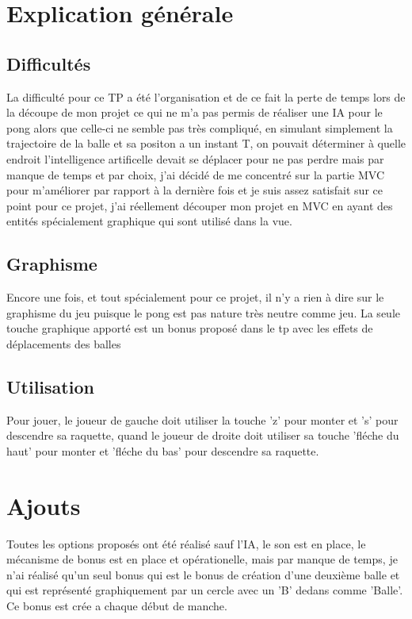 \documentclass[a4paper]{article}
\date{19 Janvier 2017}
\begin{document}
\entete

\section{Explication générale}

\subsection{Difficultés}

La difficulté pour ce TP a été l'organisation et de ce fait la perte de temps lors de la découpe de mon projet ce qui ne m'a pas permis de réaliser une IA pour le pong alors que celle-ci ne semble pas très compliqué, en simulant simplement la trajectoire de la balle et sa positon a un instant T, on pouvait déterminer à quelle endroit l'intelligence artificelle devait se déplacer pour ne pas perdre mais par manque de temps et par choix, j'ai décidé de me concentré sur la partie MVC pour m'améliorer par rapport à la dernière fois et je suis assez satisfait sur ce point pour ce projet, j'ai réellement découper mon projet en MVC en ayant des entités spécialement graphique qui sont utilisé dans la vue.

\subsection{Graphisme}

Encore une fois, et tout spécialement pour ce projet, il n'y a rien à dire sur le graphisme du jeu puisque le pong est pas nature très neutre comme jeu. La seule touche graphique apporté est un bonus proposé dans le tp avec les effets de déplacements des balles


\subsection{Utilisation}

Pour jouer, le joueur de gauche doit utiliser la touche 'z' pour monter et 's' pour descendre sa raquette, quand le joueur de droite doit utiliser sa touche 'fléche du haut' pour monter et 'fléche du bas'
 pour descendre sa raquette. 
\section{Ajouts}

Toutes les options proposés ont été réalisé sauf l'IA, le son est en place, le mécanisme de bonus est en place et opérationelle, mais par manque de temps, je n'ai réalisé qu'un seul bonus qui est le bonus de création d'une deuxième balle et qui est représenté graphiquement par un cercle avec un 'B' dedans comme 'Balle'.
Ce bonus est crée a chaque début de manche.
\end{document}
